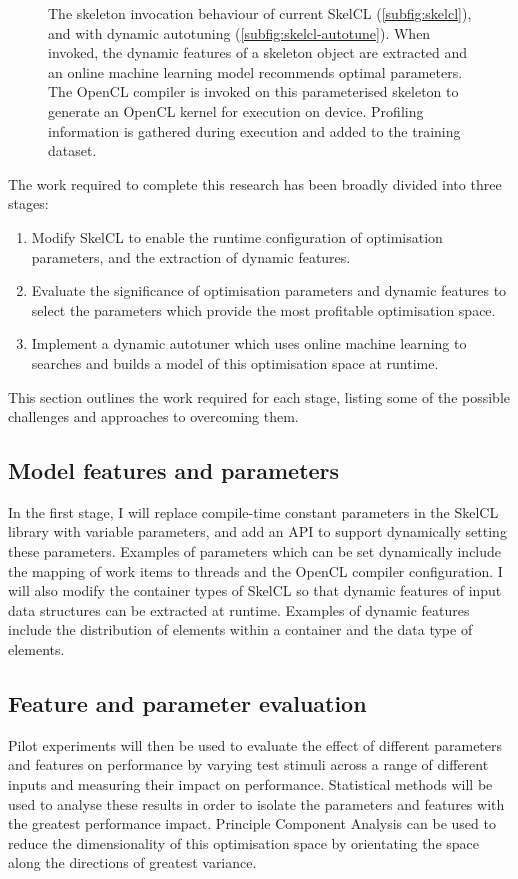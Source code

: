 \begin{figure*}[t!]
\centering

\caption{The skeleton invocation behaviour of current SkelCL
  (\ref{subfig:skelcl}), and with dynamic autotuning
  (\ref{subfig:skelcl-autotune}). When invoked, the dynamic features
  of a skeleton object are extracted and an online machine learning
  model recommends optimal parameters. The OpenCL compiler is invoked
  on this parameterised skeleton to generate an OpenCL kernel for
  execution on device. Profiling information is gathered during
  execution and added to the training dataset.}
\label{fig:method}
\end{figure*}

The work required to complete this research has been broadly divided
into three stages:

\begin{enumerate}
\item Modify SkelCL to enable the runtime configuration of
  optimisation parameters, and the extraction of dynamic features.
\item Evaluate the significance of optimisation parameters and dynamic
  features to select the parameters which provide the most profitable
  optimisation space.
\item Implement a dynamic autotuner which uses online machine learning
  to searches and builds a model of this optimisation space at
  runtime.
\end{enumerate}

This section outlines the work required for each stage, listing some
of the possible challenges and approaches to overcoming them.

\subsection{Model features and parameters}
In the first stage, I will replace compile-time constant parameters in
the SkelCL library with variable parameters, and add an API to support
dynamically setting these parameters. Examples of parameters which can
be set dynamically include the mapping of work items to threads and
the OpenCL compiler configuration. I will also modify the container
types of SkelCL so that dynamic features of input data structures can
be extracted at runtime. Examples of dynamic features include the
distribution of elements within a container and the data type of
elements.

\subsection{Feature and parameter evaluation}
Pilot experiments will then be used to evaluate the effect of
different parameters and features on performance by varying test
stimuli across a range of different inputs and measuring their impact
on performance. Statistical methods will be used to analyse these
results in order to isolate the parameters and features with the
greatest performance impact. Principle Component Analysis can be used
to reduce the dimensionality of this optimisation space by orientating
the space along the directions of greatest variance.


